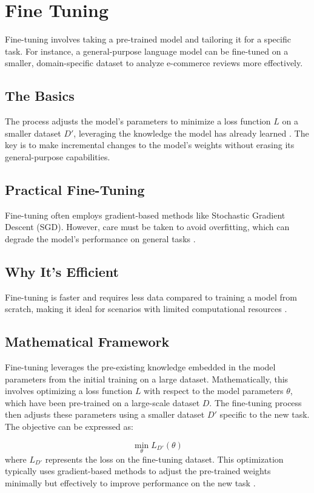 \section{Fine Tuning} %
Fine-tuning involves taking a pre-trained model and tailoring it for a specific task. For instance, a general-purpose language model can be fine-tuned on a smaller, domain-specific dataset to analyze e-commerce reviews more effectively.

\subsection{The Basics}
The process adjusts the model's parameters to minimize a loss function \(L\) on a smaller dataset \(D'\), leveraging the knowledge the model has already learned \cite{Lalor2017Improving}. The key is to make incremental changes to the model's weights without erasing its general-purpose capabilities.

\subsection{Practical Fine-Tuning}
Fine-tuning often employs gradient-based methods like Stochastic Gradient Descent (SGD). However, care must be taken to avoid overfitting, which can degrade the model's performance on general tasks \cite{Catani2020A}.

\subsection{Why It's Efficient}
Fine-tuning is faster and requires less data compared to training a model from scratch, making it ideal for scenarios with limited computational resources \cite{Xiao2023Offsite-Tuning:}.

\subsection{Mathematical Framework}
Fine-tuning leverages the pre-existing knowledge embedded in the model parameters from the initial training on a large dataset. Mathematically, this involves optimizing a loss function $L$ with respect to the model parameters $\theta$, which have been pre-trained on a large-scale dataset $D$. The fine-tuning process then adjusts these parameters using a smaller dataset $D'$ specific to the new task. The objective can be expressed as:

\[
\min_{\theta} L_{D'}(\theta)
\]
where $L_{D'}$ represents the loss on the fine-tuning dataset. This optimization typically uses gradient-based methods to adjust the pre-trained weights minimally but effectively to improve performance on the new task \cite{Lalor2017Improving}.

